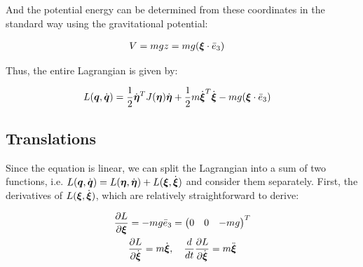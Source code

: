 \documentclass{article}
\begin{document}



And the potential energy can be determined from these coordinates in the standard way using the gravitational potential:

\begin{align}
    V & = m g z = m g (\boldsymbol{\xi} \cdot \bar{e}_3)
\end{align}

Thus, the entire Lagrangian is given by:

\begin{align}
    L(\boldsymbol{q}, \dot{\boldsymbol{q}}) & = 
    \frac{1}{2} \dot{\boldsymbol{\eta}}^T J(\boldsymbol{\eta}) \dot{\boldsymbol{\eta}} +
    \frac{1}{2} m \dot{\boldsymbol{\xi}}^T \dot{\boldsymbol{\xi}} -
    m g (\boldsymbol{\xi} \cdot \bar{e}_3)
\end{align}

\subsection{Translations}

Since the equation is linear, we can split the Lagrangian into a sum of two functions, i.e. $L(\boldsymbol{q}, \dot{\boldsymbol{q}}) = L(\boldsymbol{\eta}, \dot{\boldsymbol{\eta}}) + L(\boldsymbol{\xi}, \dot{\boldsymbol{\xi}})$ and consider them separately. First, the derivatives of $L(\boldsymbol{\xi}, \dot{\boldsymbol{\xi}})$, which are relatively straightforward to derive:

\begin{gather}
    \frac{\partial L}{\partial \boldsymbol{\xi}} = - mg \bar{e}_3 = 
    \begin{pmatrix} 0 & 0 & - mg \end{pmatrix}^T \\
    \frac{\partial L}{\partial \dot{\boldsymbol{\xi}}} = m \dot{\boldsymbol{\xi}} 
    , \quad 
    \frac{d }{d t} \frac{\partial L}{\partial \dot{\boldsymbol{\xi}}} = m \ddot{\boldsymbol{\xi}}
\end{gather}
\end{document}
